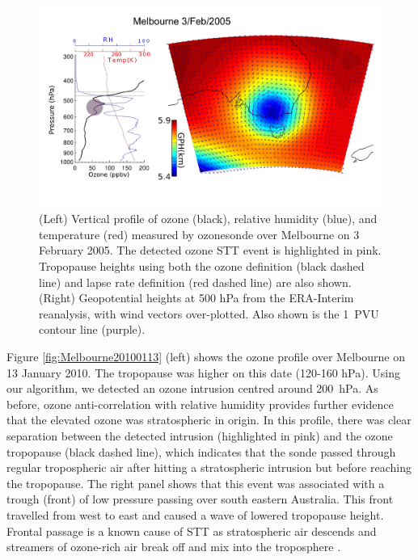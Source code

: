 \documentclass[acp, manuscript]{copernicus} %
\begin{document}
    \begin{figure}[t]
      \includegraphics[width=14.0cm]{figures/Melbourne20050203.png}
      \caption{(Left) Vertical profile of ozone (black), relative humidity (blue), and temperature (red) measured by ozonesonde over Melbourne on 3 February 2005.
      The detected ozone STT event is highlighted in pink.
      Tropopause heights using both the ozone definition (black dashed line) and lapse rate definition (red dashed line) are also shown.
      (Right) Geopotential heights at 500 hPa from the ERA-Interim reanalysis, with wind vectors over-plotted.
      Also shown is the 1~PVU contour line (purple).}
      \label{fig:Melbourne20050203}
    \end{figure}

    Figure \ref{fig:Melbourne20100113} (left) shows the ozone profile over Melbourne on 13 January 2010.
    The tropopause was higher on this date (120-160 hPa).
    Using our algorithm, we detected an ozone intrusion centred around 200~hPa.
    As before, ozone anti-correlation with relative humidity provides further evidence that the elevated ozone was stratospheric in origin.
    In this profile, there was clear separation between the detected intrusion (highlighted in pink) and the ozone tropopause (black dashed line), which indicates that the sonde passed through regular tropospheric air after hitting a stratospheric intrusion but before reaching the tropopause.
    The right panel shows that this event was associated with a trough (front) of low pressure passing over south eastern Australia.
    This front travelled from west to east and caused a wave of lowered tropopause height. 
    Frontal passage is a known cause of STT as stratospheric air descends and streamers of ozone-rich air break off and mix into the troposphere \citep{Sprenger2003}.
\end{document}
